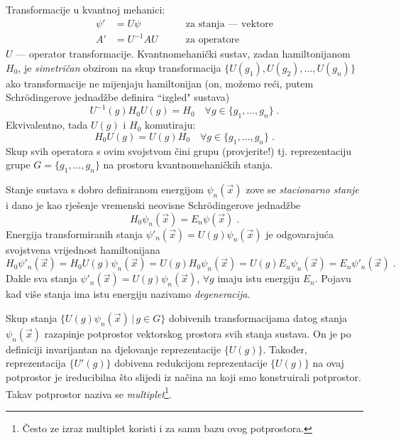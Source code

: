 Transformacije u kvantnoj mehanici:
\begin{align*}
 \psi' &= U \psi \qquad &\text{za stanja --- vektore} \\
   A' &= U^{-1} A U \qquad &\text{za operatore}
\end{align*}
$U$ --- operator transformacije. Kvantnomehanički sustav, zadan
hamiltonijanom $H_0$, je \emph{simetričan} obzirom na skup transformacija
$\{ U(g_1), U(g_2), \ldots, U(g_n)\}$ ako transformacije ne mijenjaju
hamiltonijan (on, možemo reći, putem Schr\"{o}dingerove jednadžbe definira ``izgled"
sustava)
\begin{displaymath}
U^{-1}(g) H_{0} U(g) = H_{0} \quad \forall  g \in \{g_1,\ldots, g_n\}\;.
\end{displaymath}
Ekvivalentno, tada $U(g)$ i $H_0$ komutiraju:
\begin{displaymath}
  H_{0}U(g)=U(g)H_0 \quad \forall  g \in \{g_1,\ldots, g_n\} \;.
\end{displaymath}
Skup svih operatora s ovim svojstvom čini grupu (provjerite!) tj.
reprezentaciju grupe $G=\{g_1,\ldots, g_n\}$ na prostoru kvantnomehaničkih 
stanja.

Stanje sustava s dobro definiranom energijom $\psi_n(\vec{x})$ zove se
\emph{stacionarno stanje} i dano je kao rješenje vremenski 
neovisne Schr\"{o}dingerove jednadžbe
\begin{displaymath}
  H_0 \psi_n(\vec{x}) = E_n \psi(\vec{x}) \;.
\end{displaymath}
Energija transformiranih stanja $\psi'_n(\vec{x}) = U(g)\psi_n(\vec{x})$ je
odgovarajuća svojstvena vrijednost hamiltonijana
\begin{displaymath}
  H_0 \psi'_n(\vec{x}) = H_0 U(g)\psi_n(\vec{x}) = U(g) H_0 \psi_n(\vec{x}) =
 U(g) E_n \psi_n(\vec{x}) = E_n \psi'_n(\vec{x}) \;.
\end{displaymath}
Dakle sva stanja $\psi'_n(\vec{x}) = U(g)\psi_n(\vec{x})$, $\forall g$ imaju
istu energiju $E_n$. Pojavu kad više stanja ima istu energiju 
nazivamo \emph{degeneracija}.

Skup stanja $\{U(g)\psi_n(\vec{x}) \,|\, g\in G\}$ dobivenih transformacijama
datog stanja $\psi_n(\vec{x})$ razapinje
potprostor vektorskog prostora svih stanja sustava. On je
po definiciji invarijantan na djelovanje reprezentacije $\{ U(g) \}$.
Također, reprezentacija $\{ U'(g) \}$ dobivena redukcijom reprezentacije
$\{ U(g) \}$ na ovaj potprostor je ireducibilna što slijedi
iz načina na koji smo konstruirali potprostor.
Takav potprostor naziva se \emph{multiplet}\footnote{Često ze izraz
multiplet koristi i za samu bazu ovog potprostora.}.

